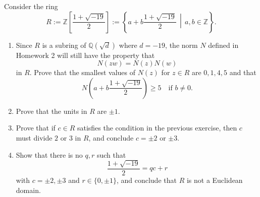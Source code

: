 \documentclass[addpoints,10pt]{exam}
\theoremstyle{plain}
\theoremstyle{definition}
\newtheorem{prob}[thm]{Problem}
\theoremstyle{plain}
\theoremstyle{plain}
\theoremstyle{definition}
\let\oldprob\prob
\let\endoldprob\endprob
\renewenvironment{prob}
  {\begin{singlespace}\oldprob}
  {\endoldprob\end{singlespace}}
\newcommand{\QQ}{\ensuremath{\mathbb{Q}}}
\newcommand{\ZZ}{\ensuremath{\mathbb{Z}}}
\begin{document}
\newpage
\begin{prob}
Consider the ring
$$
R := \ZZ\left[\frac{1+\sqrt{-19}}{2}\right]
:= \left\{a + b\frac{1+\sqrt{-19}}{2} \,\middle|\, a,b \in \ZZ\right\}.
$$
\begin{enumerate}[label=(\alph*)]
\item Since $R$ is a subring of $\QQ(\sqrt{d})$ where $d=-19$, the norm $N$ defined in Homework 2 will still have the property that
$$
N(zw)=N(z)N(w)
$$
in $R$. Prove that the smallest values of $N(z)$ for $z\in R$ are $0,1,4,5$ and that
$$
N\!\left(a + b\frac{1+\sqrt{-19}}{2}\right) \ge 5 \quad \text{if } b\ne 0.
$$
\item Prove that the units in $R$ are $\pm 1$.
\item Prove that if $c \in R$ satisfies the condition in the previous exercise, then $c$ must divide $2$ or $3$ in $R$, and conclude $c=\pm 2$ or $\pm 3$.
\item Show that there is no $q,r$ such that
$$
\frac{1+\sqrt{-19}}{2}=qc+r
$$
with $c=\pm 2,\pm 3$ and $r\in\{0,\pm 1\}$, and conclude that $R$ is not a Euclidean domain.
\end{enumerate}
\end{prob}
\end{document}
